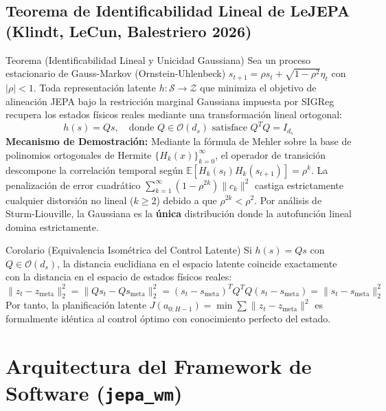 \documentclass[10pt,a4paper]{article}
\begin{document}
\subsection{Teorema de Identificabilidad Lineal de LeJEPA (Klindt, LeCun, Balestriero 2026)}
\begin{theorembox}{Teorema (Identificabilidad Lineal y Unicidad Gaussiana)}
Sea un proceso estacionario de Gauss-Markov (Ornstein-Uhlenbeck) $s_{t+1} = \rho s_t + \sqrt{1-\rho^2}\eta_t$ con $|\rho| < 1$. Toda representación latente $h: \mathcal{S} \to \mathcal{Z}$ que minimiza el objetivo de alineación JEPA bajo la restricción marginal Gaussiana impuesta por SIGReg recupera los estados físicos reales mediante una transformación lineal ortogonal:
\begin{equation}
    h(s) = Q s, \quad \text{donde } Q \in \mathcal{O}(d_s) \text{ satisface } Q^T Q = I_{d_s}
\end{equation}
\textbf{Mecanismo de Demostración:} Mediante la fórmula de Mehler sobre la base de polinomios ortogonales de Hermite $\{H_k(x)\}_{k=0}^\infty$, el operador de transición descompone la correlación temporal según $\mathbb{E}[H_k(s_t)H_k(s_{t+1})] = \rho^k$. La penalización de error cuadrático $\sum_{k=1}^\infty (1-\rho^{2k})\|c_k\|^2$ castiga estrictamente cualquier distorsión no lineal ($k \ge 2$) debido a que $\rho^{2k} < \rho^2$. Por análisis de Sturm-Liouville, la Gaussiana es la \textbf{única} distribución donde la autofunción lineal domina estrictamente.
\end{theorembox}

\begin{theorembox}{Corolario (Equivalencia Isométrica del Control Latente)}
Si $h(s) = Qs$ con $Q \in \mathcal{O}(d_s)$, la distancia euclidiana en el espacio latente coincide exactamente con la distancia en el espacio de estados físicos reales:
\begin{equation}
    \|z_t - z_{\text{meta}}\|_2^2 = \|Qs_t - Qs_{\text{meta}}\|_2^2 = (s_t - s_{\text{meta}})^T Q^T Q (s_t - s_{\text{meta}}) = \|s_t - s_{\text{meta}}\|_2^2
\end{equation}
Por tanto, la planificación latente $J(a_{0:H-1}) = \min \sum \|z_t - z_{\text{meta}}\|^2$ es formalmente idéntica al control óptimo con conocimiento perfecto del estado.
\end{theorembox}

\section{Arquitectura del Framework de Software (\texttt{jepa\_wm})}
\end{document}
